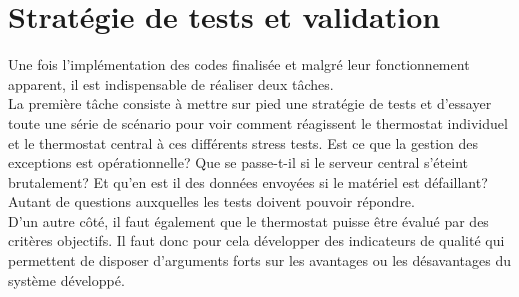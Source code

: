 \documentclass[11pt,a4paper,11pt]{report}
\begin{document}






\newpage

\chapter{Stratégie de tests et validation}

Une fois l'implémentation des codes finalisée et malgré leur fonctionnement apparent, il est indispensable de réaliser deux tâches.\\

La première tâche consiste à mettre sur pied une stratégie de tests et d'essayer toute une série de scénario pour voir comment réagissent le thermostat individuel et le thermostat central à ces différents stress tests. Est ce que la gestion des exceptions est opérationnelle? Que se passe-t-il si le serveur central s'éteint brutalement? Et qu'en est il des données envoyées si le matériel est défaillant? Autant de questions auxquelles les tests doivent pouvoir répondre.\\ 

D'un autre côté, il faut également que le thermostat puisse être évalué par des critères objectifs. Il faut donc pour cela développer des indicateurs de qualité qui permettent de disposer d'arguments forts sur les avantages ou les désavantages du système développé.\\
\end{document}
